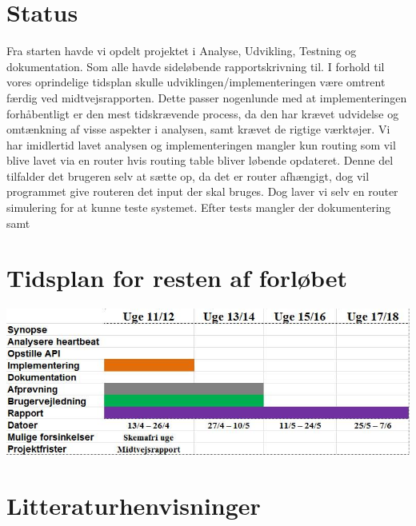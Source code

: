 \documentclass[a4paper,12pt]{article}
\begin{document}
\section*{Status}
Fra starten havde vi opdelt projektet i Analyse, Udvikling, Testning og dokumentation. Som alle havde sideløbende rapportskrivning til. I forhold til vores oprindelige tidsplan skulle udviklingen/implementeringen være omtrent færdig ved midtvejsrapporten.
Dette passer nogenlunde med at implementeringen forhåbentligt er den mest tidskrævende process, da den har krævet udvidelse og omtænkning af visse aspekter i analysen, samt krævet de rigtige værktøjer. Vi har imidlertid lavet analysen og implementeringen mangler kun routing som vil blive lavet via en router hvis routing table bliver løbende opdateret. Denne del tilfalder det brugeren selv at sætte op, da det er router afhængigt, dog vil programmet give routeren det input der skal bruges. Dog laver vi selv en router simulering for at kunne teste systemet. Efter tests mangler der dokumentering samt

\section*{Tidsplan for resten af forløbet}

\includegraphics[scale=0.5]{tidsplanmidtvej.jpg}




\section*{Litteraturhenvisninger}
\end{document}
